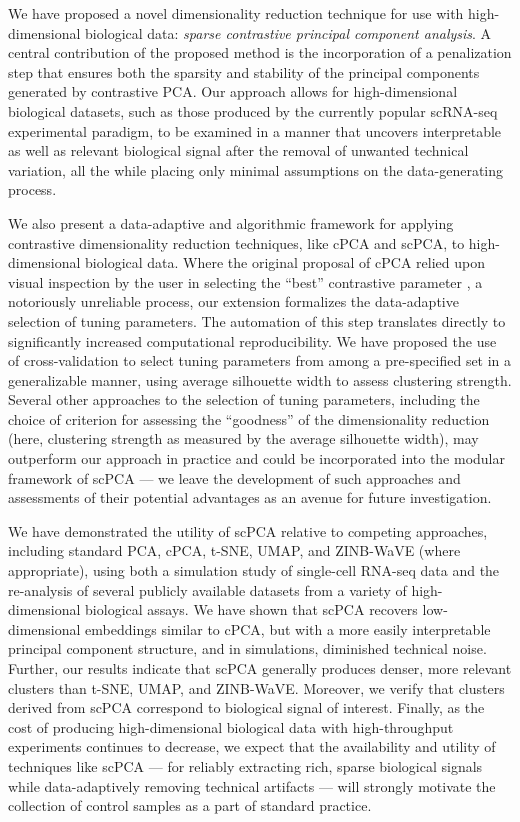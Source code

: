 We have proposed a novel dimensionality reduction technique for use with high-dimensional biological data: \textit{sparse contrastive principal component analysis}. A central contribution of the proposed method is the incorporation of a penalization step that ensures both the sparsity and stability of the principal components generated by contrastive PCA. Our approach allows for high-dimensional biological datasets, such as those produced by the currently popular scRNA-seq experimental paradigm, to be examined in a manner that uncovers interpretable as well as relevant biological signal after the removal of unwanted technical variation, all the while placing only minimal assumptions on the data-generating process.

We also present a data-adaptive and algorithmic framework for applying contrastive dimensionality reduction techniques, like cPCA and scPCA, to high-dimensional biological data. Where the original proposal of cPCA relied upon visual inspection by the user in selecting the ``best'' contrastive parameter \citep{Abid2018}, a notoriously unreliable process, our extension formalizes the data-adaptive selection of tuning parameters. The automation of this step translates directly to significantly increased computational reproducibility. We have proposed the use of cross-validation to select tuning parameters from among a pre-specified set in a generalizable manner, using average silhouette width to assess clustering strength. Several other approaches to the selection of tuning parameters, including the choice of criterion for assessing the ``goodness'' of the dimensionality reduction (here, clustering strength as measured by the average silhouette width), may outperform our approach in practice and could be incorporated into the modular framework of scPCA --- we leave the development of such approaches and assessments of their potential advantages as an avenue for future investigation.

We have demonstrated the utility of scPCA relative to competing approaches, including standard PCA, cPCA, t-SNE, UMAP, and ZINB-WaVE (where appropriate), using both a simulation study of single-cell RNA-seq data and the re-analysis of several publicly available datasets from a variety of high-dimensional biological assays. We have shown that scPCA recovers low-dimensional embeddings similar to cPCA, but with a more easily interpretable principal component structure, and in simulations, diminished technical noise. Further, our results indicate that scPCA generally produces denser, more relevant clusters than t-SNE, UMAP, and ZINB-WaVE. Moreover, we verify that clusters derived from scPCA correspond to biological signal of interest. Finally, as the cost of producing high-dimensional biological data with high-throughput experiments continues to decrease, we expect that the availability and utility of techniques like scPCA --- for reliably extracting rich, sparse biological signals while data-adaptively removing technical artifacts --- will strongly motivate the collection of control samples as a part of standard practice.